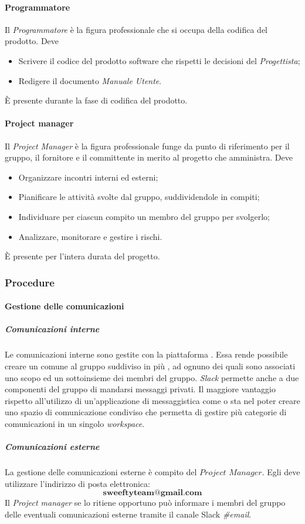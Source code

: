 \paragraph{Programmatore} \Spazio
Il \emph{Programmatore} è la figura professionale che si occupa della codifica del prodotto. Deve
\begin{itemize}
	\item Scrivere il codice  del prodotto software che rispetti le decisioni del \emph{Progettista};
	\item Redigere il documento \emph{Manuale Utente}.
\end{itemize}
È presente durante la fase di codifica del prodotto.
\paragraph{Project manager} \Spazio
Il \emph{Project Manager} è la figura professionale funge da punto di riferimento per il gruppo, il fornitore e il committente in merito al progetto che amministra. Deve
\begin{itemize}
	\item Organizzare incontri interni ed esterni;
	\item Pianificare le attività svolte dal gruppo, suddividendole in compiti;
	\item Individuare per ciascun compito un membro del gruppo per svolgerlo;
	\item Analizzare, monitorare e gestire i rischi.
\end{itemize}
È presente per l'intera durata del progetto.
\subsubsection{Procedure}
\paragraph{Gestione delle comunicazioni}
\subparagraph{Comunicazioni interne} \Spazio
\label{comInterne}
Le comunicazioni interne sono gestite con la piattaforma . Essa rende possibile creare un  comune al gruppo suddiviso in più , ad ognuno dei quali sono associati uno scopo ed un sottoinsieme dei membri del gruppo. \emph{Slack} permette anche a due componenti del gruppo di mandarsi messaggi privati. Il maggiore vantaggio rispetto all'utilizzo di un'applicazione di messaggistica come  o  sta nel poter creare uno spazio di comunicazione condiviso che permetta di gestire più categorie di comunicazioni in un singolo \emph{workspace}. %
\subparagraph{Comunicazioni esterne} \Spazio
La gestione delle comunicazioni esterne è compito del $Project$ $Manager$. Egli deve utilizzare l'indirizzo di posta elettronica:
$$\textbf{sweeftyteam@gmail.com}$$
Il \emph{Project manager} se lo ritiene opportuno può informare i membri del gruppo delle eventuali comunicazioni esterne tramite il canale Slack \emph{\#email}.

